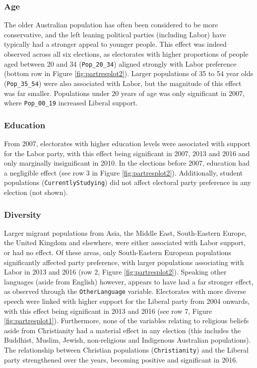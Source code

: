 \documentclass[
  times, doublespace]{anzsauth}
\begin{document}
\hypertarget{age}{%
\subsubsection*{Age}\label{age}}

The older Australian population has often been considered to be more conservative, and the left leaning political parties (including Labor) have typically had a stronger appeal to younger people. This effect was indeed observed across all six elections, as electorates with higher proportions of people aged between 20 and 34 (\texttt{Pop\_20\_34}) aligned strongly with Labor preference (bottom row in Figure \ref{fig:partresplot2}). Larger populations of 35 to 54 year olds (\texttt{Pop\_35\_54}) were also associated with Labor, but the magnitude of this effect was far smaller. Populations under 20 years of age was only significant in 2007, where \texttt{Pop\_00\_19} increased Liberal support.

\hypertarget{education}{%
\subsubsection*{Education}\label{education}}

From 2007, electorates with higher education levels were associated with support for the Labor party, with this effect being significant in 2007, 2013 and 2016 and only marginally insignificant in 2010. In the elections before 2007, education had a negligible effect (see row 3 in Figure \ref{fig:partresplot2}). Additionally, student populations (\texttt{CurrentlyStudying}) did not affect electoral party preference in any election (not shown).

\hypertarget{diversity}{%
\subsubsection*{Diversity}\label{diversity}}

Larger migrant populations from Asia, the Middle East, South-Eastern Europe, the United Kingdom and elsewhere, were either associated with Labor support, or had no effect. Of these areas, only South-Eastern European populations significantly affected party preference, with larger populations associating with Labor in 2013 and 2016 (row 2, Figure \ref{fig:partresplot2}). Speaking other languages (aside from English) however, appears to have had a far stronger effect, as observed through the \texttt{OtherLanguage} variable. Electorates with more diverse speech were linked with higher support for the Liberal party from 2004 onwards, with this effect being significant in 2013 and 2016 (see row 7, Figure \ref{fig:partresplot1}). Furthermore, none of the variables relating to religious beliefs aside from Christianity had a material effect in any election (this includes the Buddhist, Muslim, Jewish, non-religious and Indigenous Australian populations). The relationship between Christian populations (\texttt{Christianity}) and the Liberal party strengthened over the years, becoming positive and significant in 2016.
\end{document}
